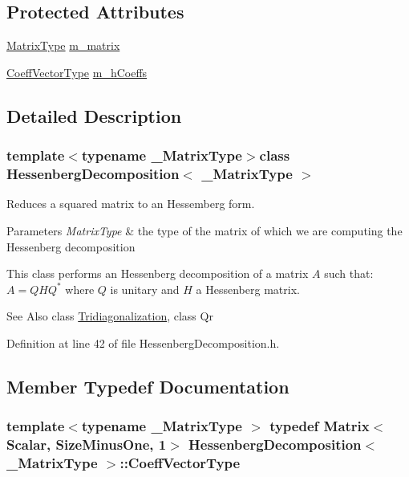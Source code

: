 \subsection*{Protected Attributes}
\begin{DoxyCompactItemize}
\item 
\hyperlink{class_hessenberg_decomposition_a9ecabc0c14a42b62ef12497bd48a0d44}{Matrix\-Type} \hyperlink{class_hessenberg_decomposition_aa85a12d4f4be86b009bc76fb78bc446e}{m\-\_\-matrix}
\item 
\hyperlink{class_hessenberg_decomposition_a7ebc295c989226902bae1b525c54e30c}{Coeff\-Vector\-Type} \hyperlink{class_hessenberg_decomposition_af1430f03174c334db69c53ee9f7185a5}{m\-\_\-h\-Coeffs}
\end{DoxyCompactItemize}


\subsection{Detailed Description}
\subsubsection*{template$<$typename \-\_\-\-Matrix\-Type$>$class Hessenberg\-Decomposition$<$ \-\_\-\-Matrix\-Type $>$}

Reduces a squared matrix to an Hessemberg form. 


\begin{DoxyParams}{Parameters}
{\em Matrix\-Type} & the type of the matrix of which we are computing the Hessenberg decomposition\\
\hline
\end{DoxyParams}
This class performs an Hessenberg decomposition of a matrix $ A $ such that\-: $ A = Q H Q^* $ where $ Q $ is unitary and $ H $ a Hessenberg matrix.

\begin{DoxySeeAlso}{See Also}
class \hyperlink{class_tridiagonalization}{Tridiagonalization}, class Qr 
\end{DoxySeeAlso}


Definition at line 42 of file Hessenberg\-Decomposition.\-h.



\subsection{Member Typedef Documentation}
\hypertarget{class_hessenberg_decomposition_a7ebc295c989226902bae1b525c54e30c}{
\subsubsection[{Coeff\-Vector\-Type}]{\setlength{\rightskip}{0pt plus 5cm}template$<$typename \-\_\-\-Matrix\-Type $>$ typedef {\bf Matrix}$<${\bf Scalar}, {\bf Size\-Minus\-One}, 1$>$ {\bf Hessenberg\-Decomposition}$<$ \-\_\-\-Matrix\-Type $>$\-::{\bf Coeff\-Vector\-Type}}}\label{class_hessenberg_decomposition_a7ebc295c989226902bae1b525c54e30c}


